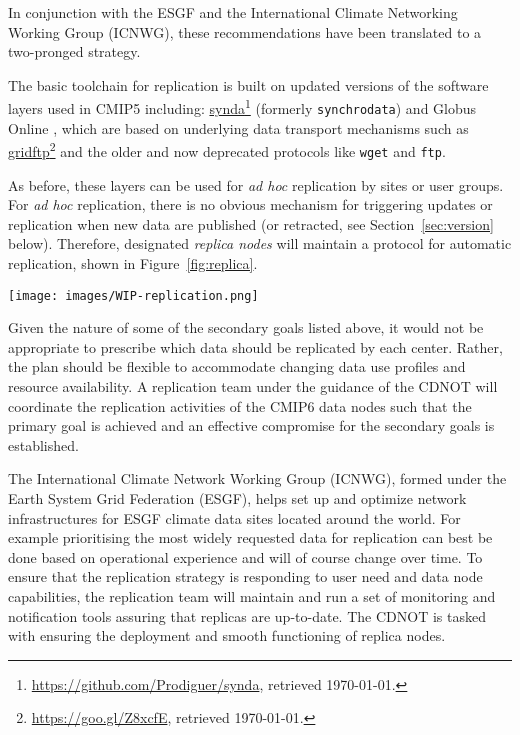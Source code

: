 \documentclass[gmd,manuscript]{copernicus}
\newcommand{\pllabel}[1]{\label{p-#1}\linelabel{l-#1}}
\newcommand{\urlref}[2] {\href{#1}{#2}\footnote{\url{#1}, retrieved \today.}}
\begin{document}
In conjunction with the ESGF and the International Climate Networking
Working Group (ICNWG), these recommendations have been translated to a
two-pronged strategy.

The basic toolchain for replication is built on updated versions of
the software layers used in CMIP5 including:
\urlref{https://github.com/Prodiguer/synda}{synda} (formerly
\texttt{synchrodata}) and Globus Online \citep{ref:chardetal2015}, which
are based on underlying data transport mechanisms such as
\urlref{https://goo.gl/Z8xcfE}{gridftp} and the older and now deprecated
protocols like \texttt{wget} and \texttt{ftp}.

As before, these layers can be used for \emph{ad hoc} replication by
sites or user groups. For \emph{ad hoc} replication, there is no
obvious mechanism for triggering updates or replication when new data
are published (or retracted, see Section~\ref{sec:version} below).
Therefore, designated \emph{replica nodes} will maintain a protocol
for automatic replication, shown in Figure~\ref{fig:replica}.

\begin{figure*}
  \begin{center}
    \texttt{[image: images/WIP-replication.png]}
  \end{center}
  \caption{CMIP6 replication from data nodes to replica centers and
    between replica centers coordinated by a CMIP6 replication team,
    under the guidance of the CDNOT.}
  \label{fig:replica}
\end{figure*}

Given the nature of some of the secondary goals listed above, it would
not be appropriate to prescribe which data should be replicated by
each center. Rather, the plan should be flexible to accommodate
changing data use profiles and resource availability.
\pllabel{RC1-61}
A replication team under the guidance of the CDNOT will coordinate the
replication activities of the CMIP6 data nodes such that the primary
goal is achieved and an effective compromise for the secondary goals
is established.

The International Climate Network Working Group (ICNWG), formed under
the Earth System Grid Federation (ESGF), helps set up and optimize
network infrastructures for ESGF climate data sites located around the
world. For example prioritising the most widely requested data for
replication can best be done based on operational experience and will
of course change over time. To ensure that the replication strategy is
responding to user need and data node capabilities, the replication
team will maintain and run a set of monitoring and notification tools
assuring that replicas are up-to-date. The CDNOT is tasked with
ensuring the deployment and smooth functioning of replica nodes.
\end{document}
